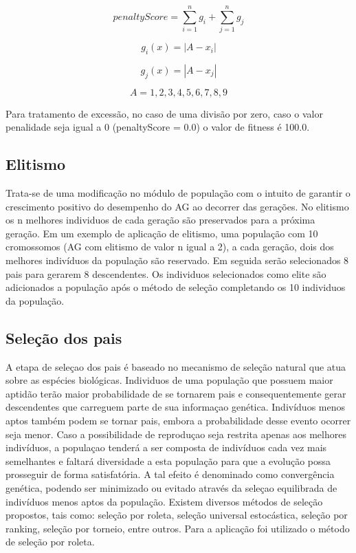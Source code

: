 \documentclass[twoside]{article}
\begin{document}
\begin{multicols}{2}
\begin{equation}
\label{eq:Cálculo de penalidades}
\label{eq:penaltyscore}
penaltyScore = { \sum\limits_{i=1}^n g_{i} + \sum\limits_{j=1}^n g_{j} }
\end{equation}

\begin{equation}
\label{eq:clin}
g_{i}(x) = |A - x_{i}|
\end{equation}

\begin{equation}
\label{eq:ccol}
g_{j}(x) = |A - x_{j}|
\end{equation}

\begin{equation}
\label{eq:U}
A = {1, 2, 3, 4, 5, 6, 7, 8, 9}
\end{equation}

Para tratamento de excessão, no caso de uma divisão por zero, caso o valor penalidade seja igual a 0 (penaltyScore = 0.0) o valor de fitness é 100.0.

\subsection{Elitismo}
Trata-se de uma modificação no módulo de população com o intuito de garantir o crescimento positivo do desempenho do AG ao decorrer das gerações. No elitismo os n melhores individuos de cada geração são preservados para a próxima geração.  Em um exemplo de aplicação de elitismo, uma população com 10 cromossomos (AG com elitismo de valor n igual a 2), a cada geração, dois dos melhores indivíduos da população são reservado. Em seguida serão selecionados 8 pais para gerarem 8 descendentes. Os individuos selecionados como elite são adicionados a população após o método de seleção completando os 10 individuos da população.

\subsection{Seleção dos pais}
A etapa de seleçao dos pais é baseado no mecanismo de seleção natural que atua sobre as espécies biológicas. Individuos de uma população que possuem maior aptidão terão maior probabilidade de se tornarem pais e consequentemente gerar descendentes que carreguem parte de sua informaçao genética. Indivíduos menos aptos também podem se tornar pais, embora a probabilidade desse evento ocorrer seja menor. Caso a possibilidade de reproduçao seja restrita apenas aos melhores indivíduos, a populaçao tenderá a ser composta de indivíduos cada vez mais semelhantes e faltará diversidade a esta população para que a evolução possa prosseguir de forma satisfatória. A tal efeito é denominado como convergência genética, podendo ser minimizado ou evitado através da seleçao equilibrada de indivíduos menos aptos da população. Existem diversos métodos de seleção propostos, tais como: seleção por roleta, seleção universal estocástica, seleção por ranking, seleção por torneio, entre outros. Para a aplicação foi utilizado o método de seleção por roleta.


\end{multicols}
\end{document}
